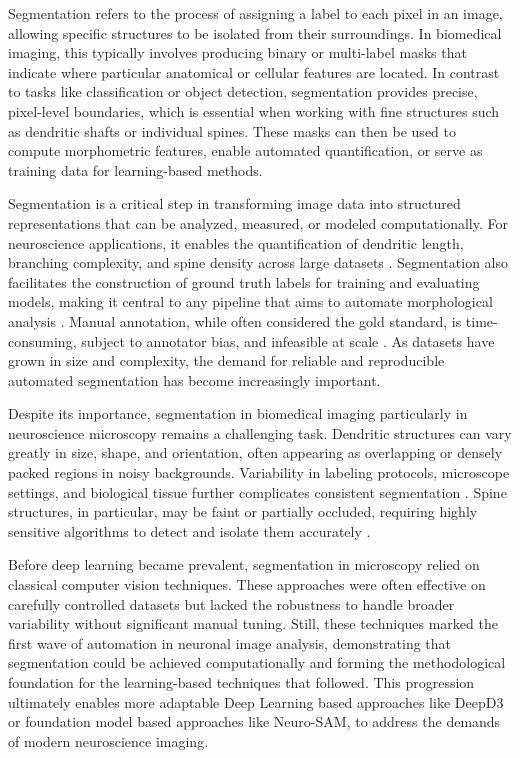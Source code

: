 Segmentation refers to the process of assigning a label to each pixel in an image, allowing specific structures to be isolated from their surroundings. In biomedical imaging, this typically involves producing binary or multi-label masks that indicate where particular anatomical or cellular features are located. In contrast to tasks like classification or object detection, segmentation provides precise, pixel-level boundaries, which is essential when working with fine structures such as dendritic shafts or individual spines. These masks can then be used to compute morphometric features, enable automated quantification, or serve as training data for learning-based methods.

Segmentation is a critical step in transforming image data into structured representations that can be analyzed, measured, or modeled computationally. For neuroscience applications, it enables the quantification of dendritic length, branching complexity, and spine density across large datasets \cite{Weaver_2004}. Segmentation also facilitates the construction of ground truth labels for training and evaluating models, making it central to any pipeline that aims to automate morphological analysis \cite{Basu_2018}. Manual annotation, while often considered the gold standard, is time-consuming, subject to annotator bias, and infeasible at scale \cite{Mancuso_2013}.  As datasets have grown in size and complexity, the demand for reliable and reproducible automated segmentation has become increasingly important.

Despite its importance, segmentation in biomedical imaging particularly in neuroscience microscopy remains a challenging task. Dendritic structures can vary greatly in size, shape, and orientation, often appearing as overlapping or densely packed regions in noisy backgrounds. Variability in labeling protocols, microscope settings, and biological tissue further complicates consistent segmentation \cite{Okabe_2020}. Spine structures, in particular, may be faint or partially occluded, requiring highly sensitive algorithms to detect and isolate them accurately \cite{Wang_2015}. 

Before deep learning became prevalent, segmentation in microscopy relied on classical computer vision techniques. These approaches were often effective on carefully controlled datasets but lacked the robustness to handle broader variability without significant manual tuning. Still, these techniques marked the first wave of automation in neuronal image analysis, demonstrating that segmentation could be achieved computationally and forming the methodological foundation for the learning-based techniques that followed. This progression ultimately enables more adaptable Deep Learning based approaches like \gls{DeepD3} or foundation model based approaches like Neuro-\gls{SAM}, to address the demands of modern neuroscience imaging.

